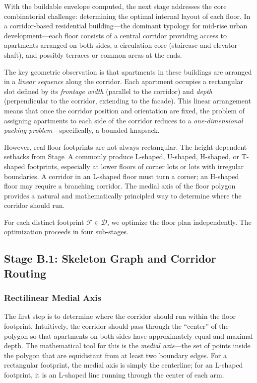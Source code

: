 \documentclass[11pt,a4paper]{article}
\newcommand{\calF}{\mathcal{F}}
\begin{document}
With the buildable envelope computed, the next stage addresses the core
combinatorial challenge: determining the optimal internal layout of each
floor. In a corridor-based residential building---the dominant typology
for mid-rise urban development---each floor consists of a central
corridor providing access to apartments arranged on both sides, a
circulation core (staircase and elevator shaft), and possibly terraces
or common areas at the ends.

The key geometric observation is that apartments in these buildings are
arranged in a \emph{linear sequence} along the corridor. Each apartment
occupies a rectangular slot defined by its \emph{frontage width}
(parallel to the corridor) and \emph{depth} (perpendicular to the
corridor, extending to the facade). This linear arrangement means that
once the corridor position and orientation are fixed, the problem of
assigning apartments to each side of the corridor reduces to a
\emph{one-dimensional packing problem}---specifically, a bounded
knapsack.

However, real floor footprints are not always rectangular. The
height-dependent setbacks from Stage~A commonly produce L-shaped,
U-shaped, H-shaped, or T-shaped footprints, especially at lower floors
of corner lots or lots with irregular boundaries. A corridor in an
L-shaped floor must turn a corner; an H-shaped floor may require a
branching corridor. The medial axis of the floor polygon provides a
natural and mathematically principled way to determine where the corridor
should run.

For each distinct footprint $\calF \in \mathcal{D}$, we optimize the floor
plan independently. The optimization proceeds in four sub-stages.


\subsection{Stage B.1: Skeleton Graph and Corridor Routing}\label{sec:skeleton}

\subsubsection{Rectilinear Medial Axis}

The first step is to determine where the corridor should run within the
floor footprint. Intuitively, the corridor should pass through the
``center'' of the polygon so that apartments on both sides have
approximately equal and maximal depth. The mathematical tool for this
is the \emph{medial axis}---the set of points inside the polygon that
are equidistant from at least two boundary edges. For a rectangular
footprint, the medial axis is simply the centerline; for an L-shaped
footprint, it is an L-shaped line running through the center of each
arm.
\end{document}
